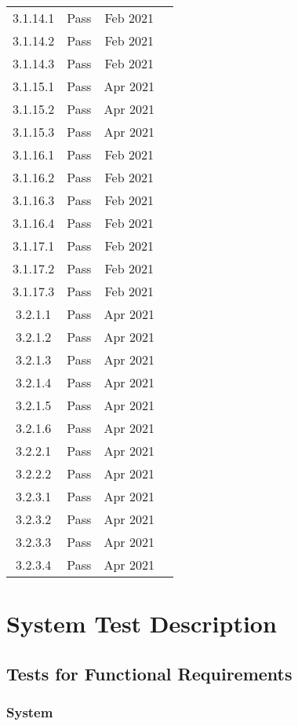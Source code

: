 \documentclass[12pt, titlepage]{article}
\begin{document}
\begin{center}
{\begin{longtable}{ |c|c|c|c| }
3.1.14.1 & Pass & Feb 2021\\
3.1.14.2 & Pass & Feb 2021\\
3.1.14.3 & Pass & Feb 2021\\
3.1.15.1 & Pass & Apr 2021\\
3.1.15.2 & Pass & Apr 2021\\
3.1.15.3 & Pass & Apr 2021\\
3.1.16.1 & Pass & Feb 2021\\
3.1.16.2 & Pass & Feb 2021\\
3.1.16.3 & Pass & Feb 2021\\
3.1.16.4 & Pass & Feb 2021\\
3.1.17.1 & Pass & Feb 2021\\
3.1.17.2 & Pass & Feb 2021\\
3.1.17.3 & Pass & Feb 2021\\
3.2.1.1 & Pass & Apr 2021\\
3.2.1.2 & Pass & Apr 2021\\
3.2.1.3 & Pass & Apr 2021\\
3.2.1.4 & Pass & Apr 2021\\
3.2.1.5 & Pass & Apr 2021\\
3.2.1.6 & Pass & Apr 2021\\
3.2.2.1 & Pass & Apr 2021\\
3.2.2.2 & Pass & Apr 2021\\
3.2.3.1 & Pass & Apr 2021\\
3.2.3.2 & Pass & Apr 2021\\
3.2.3.3 & Pass & Apr 2021\\
3.2.3.4 & Pass & Apr 2021\\
\hline
\end{longtable}}
\end{center}

\section{System Test Description}
	
\subsection{Tests for Functional Requirements}

\subsubsection{System}
\end{document}
